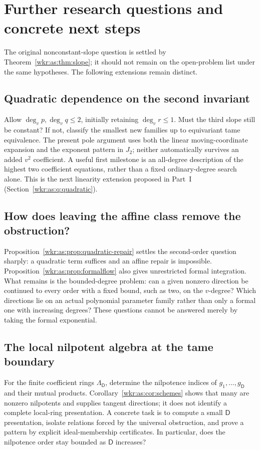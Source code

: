 \documentclass[11pt,a4paper]{article}
\numberwithin{equation}{section}
\theoremstyle{definition}
\theoremstyle{remark}
\newcommand{\Dcap}{\mathsf D}
\begin{document}
\section{Further research questions and concrete next steps}
\label{wkr:as:sec:future}

The original nonconstant-slope question is settled by
Theorem~\ref{wkr:as:thm:slope}; it should not remain on the open-problem
list under the same hypotheses. The following extensions remain distinct.

\subsection{Quadratic dependence on the second invariant}

Allow $\deg_v p,\deg_v q\le2$, initially retaining $\deg_v r\le1$.
Must the third slope still be constant? If not, classify the smallest
new families up to equivariant tame equivalence. The present pole
argument uses both the linear moving-coordinate expansion and the
exponent pattern in $J_2$; neither automatically survives an added $v^2$
coefficient. A useful first milestone is an all-degree description of the
highest two coefficient equations, rather than a fixed ordinary-degree
search alone. This is the next linearity extension proposed in Part~I
(Section~\ref{wkr:as:q:quadratic}).

\subsection{How does leaving the affine class remove the obstruction?}

Proposition~\ref{wkr:as:prop:quadratic-repair} settles the second-order
question sharply: a quadratic term suffices and an affine repair is
impossible. Proposition~\ref{wkr:as:prop:formalflow} also gives
unrestricted formal integration. What remains is the bounded-degree
problem: can a given nonzero direction be continued to every order with a
fixed bound, such as two, on the $v$-degree? Which directions lie on an
actual polynomial parameter family rather than only a formal one with
increasing degrees? These questions cannot be answered merely by taking
the formal exponential.

\subsection{The local nilpotent algebra at the tame boundary}

For the finite coefficient rings $\Lambda_{\Dcap}$, determine the
nilpotence indices of $g_1,\ldots,g_{\Dcap}$ and their mutual products.
Corollary~\ref{wkr:as:cor:schemes} shows that many are nonzero nilpotents
and supplies tangent directions; it does not identify a complete
local-ring presentation. A concrete task is to compute a small $\Dcap$
presentation, isolate relations forced by the universal obstruction, and
prove a pattern by explicit ideal-membership certificates. In particular,
does the nilpotence order stay bounded as $\Dcap$ increases?
\end{document}
